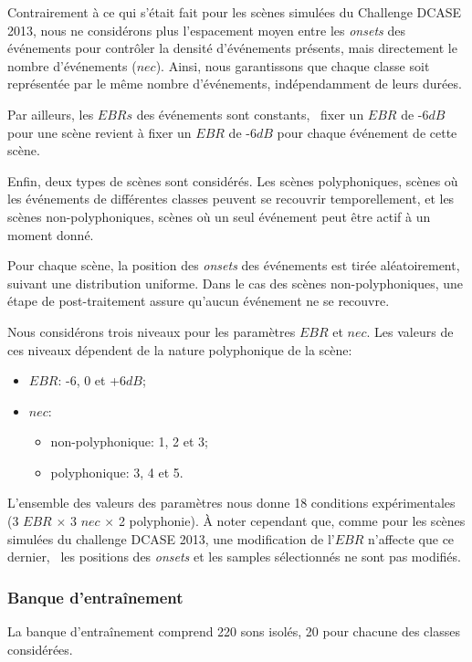 Contrairement à ce qui s'était fait pour les scènes simulées du Challenge DCASE 2013, nous ne considérons plus l'espacement moyen entre les \emph{onsets} des événements pour contrôler la densité d'événements présents, mais directement le nombre d'événements ($nec$). Ainsi, nous garantissons que chaque classe soit représentée par le même nombre d'événements, indépendamment de leurs durées.

Par ailleurs, les $EBRs$ des événements sont constants, \ie~fixer un $EBR$ de -6$dB$ pour une scène revient à fixer un $EBR$ de -6$dB$ pour chaque événement de cette scène.

Enfin, deux types de scènes sont considérés. Les scènes polyphoniques, scènes où les événements de différentes classes peuvent se recouvrir temporellement, et les scènes non-polyphoniques, scènes où un seul événement peut être actif à un moment donné.

Pour chaque scène, la position des \emph{onsets} des événements est tirée aléatoirement, suivant une distribution uniforme. Dans le cas des scènes non-polyphoniques, une étape de post-traitement assure qu'aucun événement ne se recouvre.

Nous considérons trois niveaux pour les paramètres $EBR$ et $nec$. Les valeurs de ces niveaux dépendent de la nature polyphonique de la scène:

\begin{itemize}
\item $EBR$: -6, 0 et +6$dB$;
\item $nec$: 
\begin{itemize}
\item non-polyphonique: 1, 2 et 3;
\item polyphonique: 3, 4 et 5.
\end{itemize}
\end{itemize}

L'ensemble des valeurs des paramètres nous donne 18 conditions expérimentales (3 $EBR$ $\times$ 3 $nec$ $\times$ 2 polyphonie). À noter cependant que, comme pour les scènes simulées du challenge DCASE 2013, une modification de l'$EBR$ n'affecte que ce dernier, \ie~les positions des \emph{onsets} et les samples sélectionnés ne sont pas modifiés.

\subsubsection{Banque d'entraînement}

La banque d’entraînement comprend 220 sons isolés, 20 pour chacune des classes considérées.

